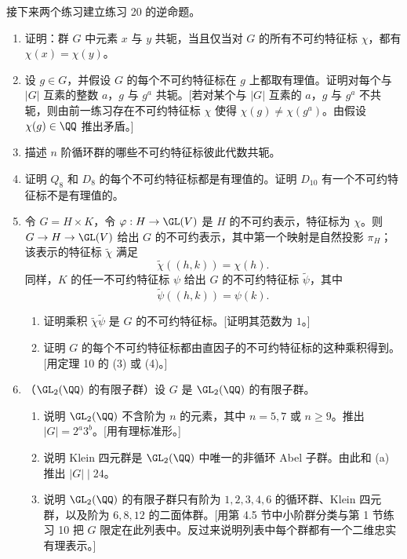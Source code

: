 接下来两个练习建立练习 20 的逆命题。
\begin{enumerate}[label=\arabic*.,resume]
  \item 证明：群 $G$ 中元素 $x$ 与 $y$ 共轭，当且仅当对 $G$ 的所有不可约特征标 $\chi$，都有 $\chi(x)=\chi(y)$。
  \item 设 $g\in G$，并假设 $G$ 的每个不可约特征标在 $g$ 上都取有理值。证明对每个与 $|G|$ 互素的整数 $a$，$g$ 与 $g^a$ 共轭。[若对某个与 $|G|$ 互素的 $a$，$g$ 与 $g^a$ 不共轭，则由前一练习存在不可约特征标 $\chi$ 使得 $\chi(g)\neq\chi(g^a)$。由假设 $\chi(g)\in\QQ$ 推出矛盾。]
  \item 描述 $n$ 阶循环群的哪些不可约特征标彼此代数共轭。
  \item 证明 $Q_8$ 和 $D_8$ 的每个不可约特征标都是有理值的。证明 $D_{10}$ 有一个不可约特征标不是有理值的。
  \item 令 $G=H\times K$，令 $\varphi:H\to\GL(V)$ 是 $H$ 的不可约表示，特征标为 $\chi$。则 $G\to H\to\GL(V)$ 给出 $G$ 的不可约表示，其中第一个映射是自然投影 $\pi_H$；该表示的特征标 $\widetilde\chi$ 满足
  \[
    \widetilde\chi((h,k))=\chi(h).
  \]
  同样，$K$ 的任一不可约特征标 $\psi$ 给出 $G$ 的不可约特征标 $\widetilde\psi$，其中
  \[
    \widetilde\psi((h,k))=\psi(k).
  \]
  \begin{enumerate}[label=(\alph*)]
    \item 证明乘积 $\widetilde\chi\widetilde\psi$ 是 $G$ 的不可约特征标。[证明其范数为 $1$。]
    \item 证明 $G$ 的每个不可约特征标都由直因子的不可约特征标的这种乘积得到。[用定理 10 的 (3) 或 (4)。]
  \end{enumerate}
  \item （$\GL_2(\QQ)$ 的有限子群）设 $G$ 是 $\GL_2(\QQ)$ 的有限子群。
  \begin{enumerate}[label=(\alph*)]
    \item 说明 $\GL_2(\QQ)$ 不含阶为 $n$ 的元素，其中 $n=5,7$ 或 $n\geq9$。推出 $|G|=2^a3^b$。[用有理标准形。]
    \item 说明 Klein 四元群是 $\GL_2(\QQ)$ 中唯一的非循环 Abel 子群。由此和 (a) 推出 $|G|\mid24$。
    \item 说明 $\GL_2(\QQ)$ 的有限子群只有阶为 $1,2,3,4,6$ 的循环群、Klein 四元群，以及阶为 $6,8,12$ 的二面体群。[用第 4.5 节中小阶群分类与第 1 节练习 10 把 $G$ 限定在此列表中。反过来说明列表中每个群都有一个二维忠实有理表示。]
  \end{enumerate}
\end{enumerate}

